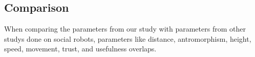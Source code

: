 \subsection{Comparison}
When comparing the parameters from our study with parameters from other studys done on social robots, parameters like distance, antromorphism, height, speed, movement, trust, and usefulness overlaps. 